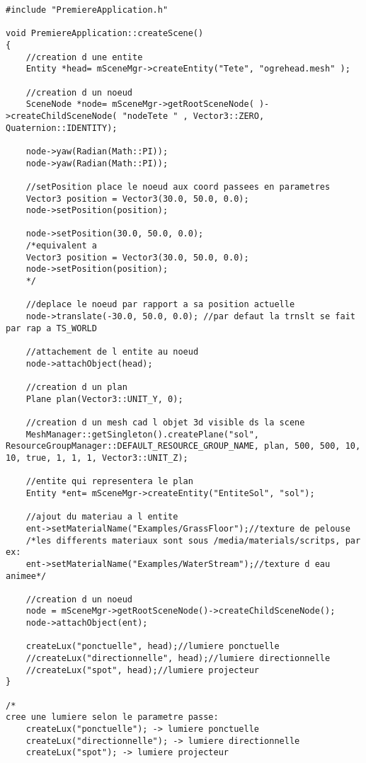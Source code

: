 \begin{lstlisting}[caption={PremiereApplication.cpp: ajout d'une m\'ethode pour la gestion de lumi\`ere et des ombres}]
#include "PremiereApplication.h"

void PremiereApplication::createScene()
{
    //creation d une entite
    Entity *head= mSceneMgr->createEntity("Tete", "ogrehead.mesh" );
    
    //creation d un noeud
    SceneNode *node= mSceneMgr->getRootSceneNode( )->createChildSceneNode( "nodeTete " , Vector3::ZERO, Quaternion::IDENTITY);
    
    node->yaw(Radian(Math::PI));
    node->yaw(Radian(Math::PI));

    //setPosition place le noeud aux coord passees en parametres
    Vector3 position = Vector3(30.0, 50.0, 0.0);
    node->setPosition(position);

    node->setPosition(30.0, 50.0, 0.0); 
    /*equivalent a
    Vector3 position = Vector3(30.0, 50.0, 0.0);
    node->setPosition(position);
    */

    //deplace le noeud par rapport a sa position actuelle
    node->translate(-30.0, 50.0, 0.0); //par defaut la trnslt se fait par rap a TS_WORLD
   
    //attachement de l entite au noeud
    node->attachObject(head);

    //creation d un plan
    Plane plan(Vector3::UNIT_Y, 0);

    //creation d un mesh cad l objet 3d visible ds la scene
    MeshManager::getSingleton().createPlane("sol",  ResourceGroupManager::DEFAULT_RESOURCE_GROUP_NAME, plan, 500, 500, 10, 10, true, 1, 1, 1, Vector3::UNIT_Z); 

    //entite qui representera le plan
    Entity *ent= mSceneMgr->createEntity("EntiteSol", "sol");

    //ajout du materiau a l entite
    ent->setMaterialName("Examples/GrassFloor");//texture de pelouse
    /*les differents materiaux sont sous /media/materials/scritps, par ex:
    ent->setMaterialName("Examples/WaterStream");//texture d eau animee*/

    //creation d un noeud
    node = mSceneMgr->getRootSceneNode()->createChildSceneNode();
    node->attachObject(ent);

    createLux("ponctuelle", head);//lumiere ponctuelle
    //createLux("directionnelle", head);//lumiere directionnelle
    //createLux("spot", head);//lumiere projecteur
}

/*
cree une lumiere selon le parametre passe:
    createLux("ponctuelle"); -> lumiere ponctuelle
    createLux("directionnelle"); -> lumiere directionnelle
    createLux("spot"); -> lumiere projecteur
    

\end{lstlisting}
